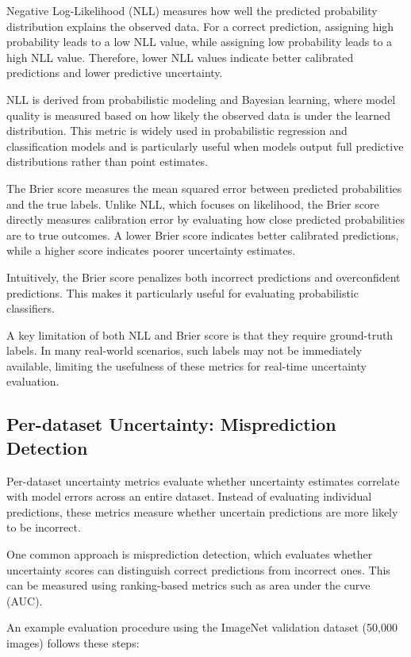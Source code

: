 \documentclass{article}
\begin{document}
Negative Log-Likelihood (NLL) measures how well the predicted probability distribution explains the observed data. For a correct prediction, assigning high probability leads to a low NLL value, while assigning low probability leads to a high NLL value. Therefore, lower NLL values indicate better calibrated predictions and lower predictive uncertainty.

NLL is derived from probabilistic modeling and Bayesian learning, where model quality is measured based on how likely the observed data is under the learned distribution. This metric is widely used in probabilistic regression and classification models and is particularly useful when models output full predictive distributions rather than point estimates.

The Brier score measures the mean squared error between predicted probabilities and the true labels. Unlike NLL, which focuses on likelihood, the Brier score directly measures calibration error by evaluating how close predicted probabilities are to true outcomes. A lower Brier score indicates better calibrated predictions, while a higher score indicates poorer uncertainty estimates.

Intuitively, the Brier score penalizes both incorrect predictions and overconfident predictions. This makes it particularly useful for evaluating probabilistic classifiers.

A key limitation of both NLL and Brier score is that they require ground-truth labels. In many real-world scenarios, such labels may not be immediately available, limiting the usefulness of these metrics for real-time uncertainty evaluation.

\subsection{Per-dataset Uncertainty: Misprediction Detection}

Per-dataset uncertainty metrics evaluate whether uncertainty estimates correlate with model errors across an entire dataset. Instead of evaluating individual predictions, these metrics measure whether uncertain predictions are more likely to be incorrect.

One common approach is misprediction detection, which evaluates whether uncertainty scores can distinguish correct predictions from incorrect ones. This can be measured using ranking-based metrics such as area under the curve (AUC).

An example evaluation procedure using the ImageNet validation dataset (50,000 images) follows these steps:
\end{document}
